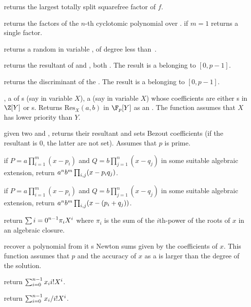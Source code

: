  returns the largest totally split
squarefree factor of $f$.

 returns the factors
of the $n$-th cyclotomic polynomial over . if $m=1$ returns
a single factor.

 returns a random 
in variable , of degree less than~.

 returns the resultant
of  and , both . The result is a 
belonging to $[0,p-1]$.

 returns the discriminant
of the  . The result is a  belonging to $[0,p-1]$.

,  a  of
s (say in variable $X$),  a  (say in variable $X$)
whose coefficients are either s in $\Z[Y]$ or s.
Returns $\text{Res}_X(a, b)$ in $\F_p[Y]$ as an . The function
assumes that $X$ has lower priority than $Y$.

given two   and ,
returns their resultant and sets Bezout coefficients (if the resultant is $0$,
the latter are not set). Assumes that $p$ is prime.

 if
$P=a\prod_{i=1}^m(x-p_i)$ and $Q=b\prod_{j=1}^n(x-q_j)$ in some suitable
algebraic extension, return $a^n\*b^m\prod_{i,j}(x-p_i\*q_j)$.

 if
$P=a\prod_{i=1}^m(x-p_i)$ and $Q=b\prod_{j=1}^n(x-q_j)$ in some suitable
algebraic extension, return $a^n\*b^m\prod_{i,j}(x-(p_i+q_j))$.

 return
$\sum{i=0}^{n-1} \pi_i\*X^i$ where $\pi_i$ is the sum of the $i$th-power
of the roots of $x$ in an algebraic closure.

 recover a polynomial from it
s Newton sums given by the coefficients of $x$.
This function assumes that $p$ and the accuracy of $x$ as a  is
larger than the degree of the solution.

 return
$\sum_{i=0}^{n-1} x_i\*i!\*X^i$.

 return
$\sum_{i=0}^{n-1} x_i/{i!}\*X^i$.

